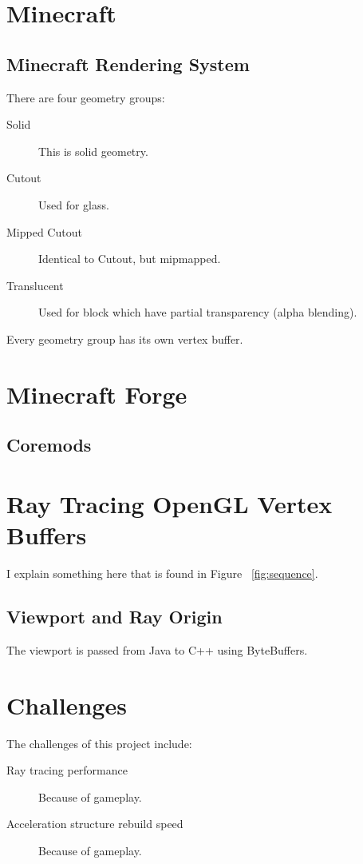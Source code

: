 \documentclass[]{article}
\begin{document}
\section{Minecraft}

\subsection{Minecraft Rendering System}
There are four geometry groups:
\begin{description}
  \item[Solid] This is solid geometry.
  \item[Cutout] Used for glass.
  \item[Mipped Cutout] Identical to Cutout, but mipmapped.
  \item[Translucent] Used for block which have partial transparency (alpha blending).
\end{description}
Every geometry group has its own vertex buffer.

\section{Minecraft Forge}

\subsection{Coremods}

\section{Ray Tracing OpenGL Vertex Buffers}

I explain something here that is found in Figure ~\ref{fig:sequence}.
\subsection{Viewport and Ray Origin}
The viewport is passed from Java to C++ using ByteBuffers.

\section{Challenges}
The challenges of this project include:
\begin{description}
  \item [Ray tracing performance] Because of gameplay.
  \item [Acceleration structure rebuild speed] Because of gameplay.
\end{description}
\end{document}

